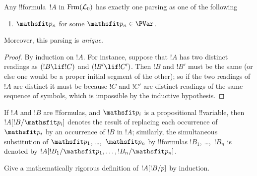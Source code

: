 \documentclass[../../../include/open-logic-section]{subfiles}
\begin{document}
\begin{prop}
Any !!{formula}~$!A$ in $ \Frm[L_0]$ has exactly one parsing as one of
the following
\begin{enumerate}


\item $\Obj p_n$ for some $\Obj p_n \in  \PVar$.
  




\end{enumerate}
Moreover, this parsing is \emph{unique}.
\end{prop}

\begin{proof}
By induction on $!A$. For instance, suppose that $!A$ has two distinct
readings as $(!B \lif !C)$ and $(!B' \lif !C')$. Then $!B$ and $!B'$
must be the same (or else one would be a proper initial segment of the
other); so if the two readings of $!A$ are distinct it must be because
$!C$ and $!C'$ are distinct readings of the same sequence of symbols,
which is impossible by the inductive hypothesis.
\end{proof}


\begin{defn}
If $!A$ and $!B$ are !!{formula}s, and $\Obj p_i$ is a propositional
!!{variable}, then $\Subst{!A}{!B}{\Obj p_i}$ denotes the result of
replacing each occurrence of $\Obj p_i$ by an occurrence of $!B$ in $!A$;
similarly, the simultaneous substitution of $\Obj p_1$, \dots,~$\Obj p_n$ by
!!{formula}s $!B_1$, \dots,~$!B_n$ is denoted by
$\SSubst{!A}{\subst{!B_1}{\Obj p_1},\dots,\subst{!B_n}{\Obj p_n}}$.
\end{defn}


\begin{prob}
Give a mathematically rigorous definition of $!A[!B/p]$ by
induction.
\end{prob}
\end{document}
